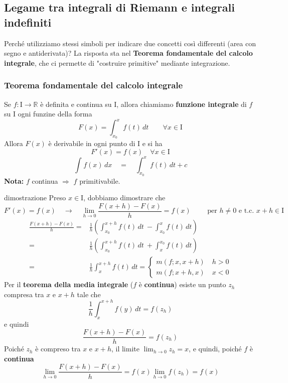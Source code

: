 \documentclass[x11names]{article}
\begin{document}
	\subsection{Legame tra integrali di Riemann e integrali indefiniti}
	Perché utilizziamo stessi simboli per indicare due concetti così differenti (area con segno e antiderivata)? La risposta sta nel \textbf{Teorema fondamentale del calcolo integrale}, che ci permette di "costruire primitive" mediante integrazione.
	\begin{center}
		\colorbox{myred}{\begin{minipage}{5.75in}
				\begin{redes}{}
					\subsubsection{Teorema fondamentale del calcolo integrale}
					Se $f: \text{I} \to \mathbb{R}$ è definita e continua su I, allora chiamiamo \textbf{funzione integrale} di $f$ su I ogni funzine della forma
					\[
					F(x) = \int_{x_0}^{x}f(t) \,dt \qquad \forall x \in \text{I}
					\]
					Allora $F(x)$ è derivabile in ogni punto di I e si ha
					\[
					F'(x) = f(x) \quad \forall x \in \text{I}
					\]
					\[
					\int_{}^{}f(x) \,dx \quad = \quad \int_{x_0}^{x}f(t) \,dt + c
					\]
					\textbf{Nota: } $f$ continua $\Longrightarrow$ $f$ primitivabile.
				\end{redes}
		\end{minipage}}        
	\end{center}
	
	\begin{es}{dimostrazione}
		Preso $x \in \text{I}$, dobbiamo dimostrare che
		\[
		F'(x) = f(x) \quad \to \quad \lim_{h \to 0} \frac{F(x+h)-F(x)}{h} = f(x) \qquad \text{ per } h \neq 0 \text{ e t.c. } x + h \in \text{I} 
		\]
		\begin{align*}
			\frac{F(x+h) - F(x)}{h} =& \frac{1}{h}\left(\int_{x_0}^{x+h}f(t) \,dt\ - \int_{x_0}^{x}f(t) \,dt\right) \\
			=& \frac{1}{h} \left(\int_{x_0}^{x+h}f(t) \,dt\ + \int_{x}^{x_0}f(t) \,dt\right) \\
			=& \frac{1}{h} \int_{x}^{x+h}f(t) \,dt = \begin{cases}
				m(f;x,x+h) \quad h>0 \\
				m(f;x+h,x) \quad x<0
			\end{cases}
		\end{align*}
		Per il \textbf{teorema della media integrale} ($f$ è \textbf{continua}) esiste un punto $z_h$ compresa tra $x$ e $x+h$ tale che 
		\[
		\frac{1}{h}  \int_{x}^{x+h}f(y) \,dt = f(z_h)
		\]
		e quindi
		\[
		\frac{F(x+h)-F(x)}{h} = f(z_h)
		\]
		Poiché $z_h$ è compreso tra $x$ e $x+h$, il limite $\lim_{h \to 0}z_h = x$, e quindi, poiché $f$ è \textbf{continua}
		\[
		\lim_{h \to 0} \frac{F(x+h)-F(x)}{h} = f(x)	\lim_{h \to 0} f(z_h) = f(x)
		\]
	\end{es}
	
\end{document}
